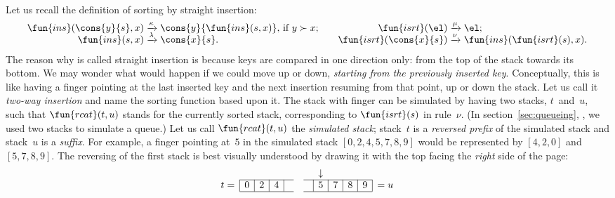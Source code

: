 Let us recall the definition of sorting by straight insertion:
\begin{equation*}
\begin{array}{@{}r@{\;}l@{\;}l@{\qquad}r@{\;}l@{\;}l@{}}
  \fun{ins}(\cons{y}{s},x)
& \xrightarrow{\smash{\kappa}}
& \cons{y}{\fun{ins}(s,x)}, \,\text{if \(y \succ x\)};
& \fun{isrt}(\el)
& \xrightarrow{\smash{\mu}}
& \el;\\
  \fun{ins}(s,x)
& \xrightarrow{\smash{\lambda}}
& \cons{x}{s}.
& \fun{isrt}(\cons{x}{s})
& \xrightarrow{\smash{\nu}}
& \fun{ins}(\fun{isrt}(s),x).
\end{array}
\end{equation*}
The reason why  is called straight
insertion is because keys are compared in one direction only: from the
top of the stack towards its bottom. We may wonder what would happen
if we could move up or down, \emph{starting from the previously
  inserted key}. Conceptually, this is like having a finger pointing
at the last inserted key and the next insertion resuming from that
point, up or down the stack. Let us call it \emph{two\hyp{}way
  insertion} and name  the sorting
function based upon it. The stack with finger can be simulated by
having two stacks, \(t\)~and~\(u\), such that
\(\fun{rcat}(t,u)\) stands for the currently
sorted stack, corresponding to
\(\fun{isrt}(s)\) in rule~\(\nu\). (In
section~\ref{sec:queueing}, , we used two
stacks to simulate a queue.) Let us call
\(\fun{rcat}(t,u)\) the \emph{simulated
  stack}; stack~\(t\) is a
\emph{reversed prefix} of the simulated
stack and stack~\(u\) is a \emph{suffix}. For
example, a finger pointing at~\(5\) in the simulated stack
\([0,2,4,5,7,8,9]\) would be represented by \([4,2,0]\) and
\([5,7,8,9]\). The reversing of the first stack is best visually
understood by drawing it with the top facing the \emph{right} side of
the page:
\begin{equation*}
\begin{array}{@{}r|c|c|c|ccc|c|c|c|c|l@{}}
  \multicolumn{1}{c}{} & \multicolumn{1}{c}{} & \multicolumn{1}{c}{}
& \multicolumn{1}{c}{} & \multicolumn{1}{c}{} & \multicolumn{1}{c}{}
& \multicolumn{1}{c}{} & \multicolumn{1}{c}{\downarrow}\\
\cline{2-5}\cline{7-11}
t = & 0 & 2 & 4 & & & & 5 & 7 & 8 & 9 & = u\\
\cline{2-5}\cline{7-11}
\end{array}
\end{equation*}
